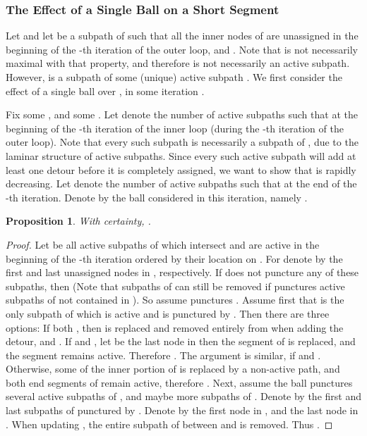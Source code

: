 \documentclass[twoside,leqno,twocolumn]{article}
\newtheorem{proposition}[theorem]{Proposition}
\begin{document}
\subsubsection{The Effect of a Single Ball on a Short Segment}
Let  and let  be a subpath of  such that all the inner nodes of  are unassigned in the beginning of the -th iteration of the outer loop, and . Note that  is not necessarily maximal with that property, and therefore is not necessarily an active subpath. However,  is a subpath of some (unique) active subpath .
We first consider the effect of a single ball over , in some iteration . 

Fix some , and some .
Let  denote the number of active subpaths  such that  at the beginning of the -th iteration of the inner loop (during the -th iteration of the outer loop). Note that every such subpath  is necessarily a subpath of , due to the laminar structure of active subpaths. Since every such active subpath will add at least one detour before it is completely assigned, we want to show that  is rapidly decreasing.
Let  denote the number of active subpaths  such that  at the end of the -th iteration. Denote by  the ball considered in this iteration, namely .
\begin{proposition} \label{p:maxBirth}
With certainty, .
\end{proposition} 

\begin{proof}
Let  be all active subpaths of  which intersect  and are active in the beginning of the -th iteration ordered by their location on . For  denote by  the first and last unassigned nodes in , respectively. If  does not puncture any of these subpaths, then  (Note that subpaths of  can still be removed if  punctures active subpaths of  not contained in ). So assume  punctures .
Assume first that  is the only subpath of  which is active and is punctured by . Then there are three options:
If both , then  is replaced and removed entirely from  when adding the detour, and .
If  and , let  be the last node in  then the  segment of  is replaced, and the segment  remains active. Therefore . The argument is similar, if  and .
Otherwise, some of the inner portion of  is replaced by a non-active path, and both end segments of  remain active, therefore .
Next, assume the ball punctures several active subpaths of , and maybe more subpaths of . Denote by  the first and last subpaths of  punctured by . Denote by  the first node in , and  the last node in . When updating , the entire subpath of  between  and  is removed. 
Thus .
\end{proof}
\end{document}
